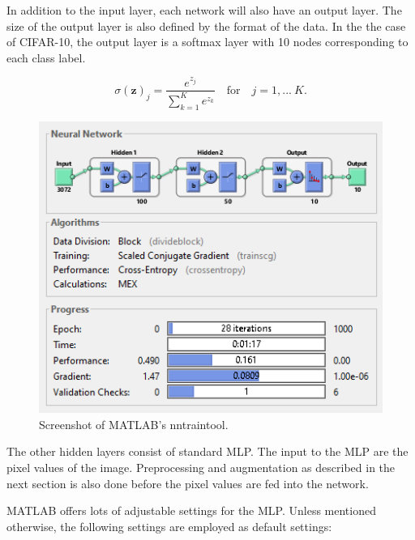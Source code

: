 In addition to the input layer, each network will also have an output layer. The size of the output layer is also defined by the format of the data. In the the case of CIFAR-10, the output layer is a softmax layer with 10 nodes corresponding to each class label.

\begin{equation}\label{eq:softmax}
\sigma(\boldsymbol{z})_j = \frac{e^{z_j}}{\sum_{k=1}^{K}e^{z_k}}\quad \textrm{for}\quad j = 1,...~K.
\end{equation}

\begin{figure}[h!]
  	\centering
  	\includegraphics{images/NNtool}
  	\caption{Screenshot of MATLAB's nntraintool.}
  	\label{fig:NNtool}
\end{figure}

The other hidden layers consist of standard MLP. The input to the MLP are the pixel values of the image. Preprocessing and augmentation as described in the next section is also done before the pixel values are fed into the network.

MATLAB offers lots of adjustable settings for the MLP. Unless mentioned otherwise, the following settings are employed as default settings:

